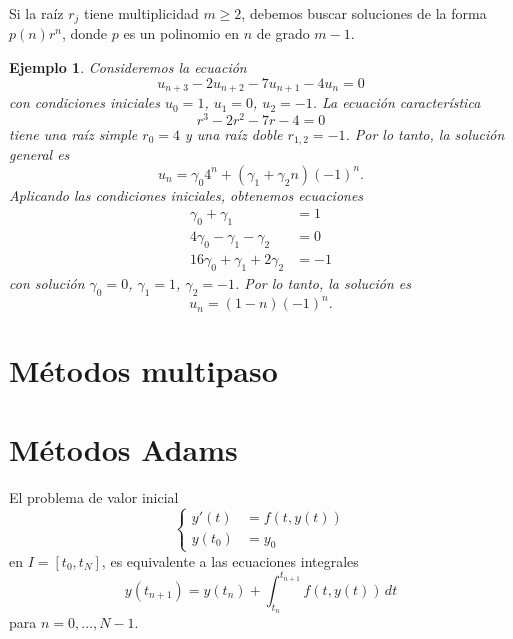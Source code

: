 \documentclass[11pt,letterpaper]{report}
\newtheorem{example}{Ejemplo}
\begin{document}
Si la raíz $r_j$ tiene multiplicidad $m\geq 2$, debemos buscar
soluciones de la forma $p(n)r^n$, donde $p$ es un polinomio en $n$ de
grado $m-1$.

\begin{example}
  Consideremos la ecuación
  \begin{equation}
    u_{n+3} -2u_{n+2} - 7 u_{n+1} - 4u_n = 0
  \end{equation}
  con condiciones iniciales $u_0=1$, $u_1=0$, $u_{2}=-1$.
  La ecuación característica
  \begin{equation}
    r^{3}-2r^{2}-7r-4 = 0
  \end{equation}
  tiene una raíz simple $r_0=4$ y una raíz doble $r_{1,2}=-1$.
  Por lo tanto, la solución general es
  \begin{equation}
    u_n = \gamma_{0}4^n + (\gamma_1+\gamma_2n)(-1)^n
  .\end{equation}
  Aplicando las condiciones iniciales, obtenemos ecuaciones
  \begin{align}
    \gamma_0+\gamma_1 &= 1 \\
    4\gamma_0-\gamma_1-\gamma_2 &= 0 \\
    16\gamma_0+\gamma_1+2\gamma_2&= -1
  \end{align}
  con solución $\gamma_0=0$, $\gamma_1=1$, $\gamma_2=-1$.
  Por lo tanto, la solución es
  \begin{equation}
    u_n = (1-n)(-1)^{n}
  .\end{equation}
\end{example}

\section{Métodos multipaso}

\section{Métodos Adams}

El problema de valor inicial
\begin{equation}
  \left\{
    \begin{aligned}
      y'(t) &= f(t,y(t)) \\
      y(t_0) &= y_0
    \end{aligned}
  \right.
\end{equation}
en $I=[t_0,t_N]$, es equivalente a las ecuaciones integrales
\begin{equation}
  y(t_{n+1}) = y(t_n) + \int_{t_n}^{t_{n+1}}\! f(t,y(t))\,dt
\end{equation}
para $n=0,\dots,N-1$.
\end{document}
